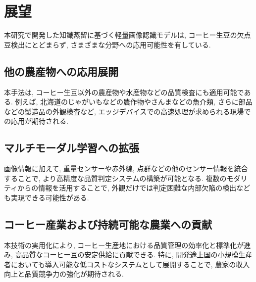 \section{展望}
本研究で開発した知識蒸留に基づく軽量画像認識モデルは, コーヒー生豆の欠点豆検出にとどまらず, さまざまな分野への応用可能性を有している. 

\subsection{他の農産物への応用展開}
本手法は, コーヒー生豆以外の農産物や水産物などの品質検査にも適用可能である. 
例えば, 北海道のじゃがいもなどの農作物やさんまなどの魚介類, さらに部品などの製造品の外観検査など, エッジデバイスでの高速処理が求められる現場での応用が期待される. 

\subsection{マルチモーダル学習への拡張}
画像情報に加えて, 重量センサーや赤外線, 点群などの他のセンサー情報を統合することで, より高精度な品質判定システムの構築が可能となる. 
複数のモダリティからの情報を活用することで, 外観だけでは判定困難な内部欠陥の検出なども実現できる可能性がある. 

\subsection{コーヒー産業および持続可能な農業への貢献}
本技術の実用化により, コーヒー生産地における品質管理の効率化と標準化が進み, 高品質なコーヒー豆の安定供給に貢献できる. 
特に, 開発途上国の小規模生産者においても導入可能な低コストなシステムとして展開することで, 農家の収入向上と品質競争力の強化が期待される. 
